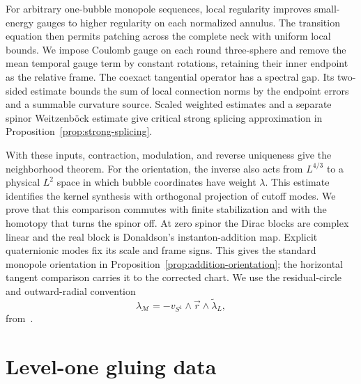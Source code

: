 \documentclass[11pt]{amsart}
\theoremstyle{definition}
\theoremstyle{remark}
\theoremstyle{plain}
\newcommand{\cM}{\mathcal{M}}
\begin{document}
For arbitrary one-bubble monopole sequences, local regularity improves
small-energy gauges to higher regularity on each normalized annulus.
The transition equation then permits patching across the complete neck
with uniform local bounds.  We impose Coulomb gauge on each round
three-sphere and remove the mean temporal gauge term by constant
rotations, retaining their inner endpoint as the relative frame.
The coexact tangential operator has a spectral gap.  Its two-sided
estimate bounds the sum of local connection norms by the endpoint
errors and a summable curvature source.  Scaled weighted estimates
and a separate spinor Weitzenb\"ock estimate give critical strong
splicing approximation in Proposition~\ref{prop:strong-splicing}.

With these inputs, contraction, modulation, and reverse uniqueness give the
neighborhood theorem.  For the orientation, the inverse also acts from
$L^{4/3}$ to a physical $L^2$ space in which bubble coordinates have
weight $\lambda$.  This estimate identifies the kernel synthesis
with orthogonal projection of cutoff modes.  We prove that this
comparison commutes with finite stabilization and with the homotopy
that turns the spinor off.  At zero spinor the Dirac blocks are
complex linear and the real block is Donaldson's instanton-addition
map.  Explicit quaternionic modes fix its scale and frame signs.
This gives the standard monopole orientation in
Proposition~\ref{prop:addition-orientation}; the horizontal tangent
comparison carries it to the corrected chart.
We use the residual-circle and outward-radial
convention
\begin{equation}\label{eq:intro-orientation}
 \lambda_{\cM}=-v_{S^1}\wedge\vec r\wedge\widetilde\lambda_L,
\end{equation}
from~\cite[Equation~(3.81)]{FeehanLenessLevelOne}.

\section{Level-one gluing data}\label{sec:gluing-data}
\end{document}
